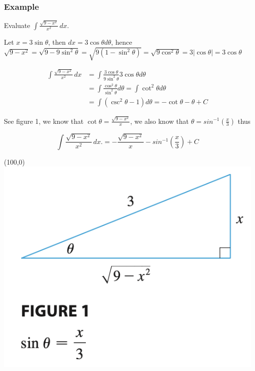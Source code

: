\documentclass[t]{beamer}
\theoremstyle{plain}
\theoremstyle{definition}
\begin{document}
\begin{frame}
\footnotesize
\frametitle{Example}
Evaluate $\displaystyle\int\frac{\sqrt{9-x^{2}}}{x^{2}}\,dx.$ \pause

\medskip

Let $x = 3 \sin \theta$,  then $dx = 3 \cos\theta d\theta$, hence $\sqrt{9 - x^2} = \sqrt{9 - 9 \sin^2\theta} = \sqrt{9 (1 - \sin^2\theta)} = \sqrt{9\cos^2\theta} = 3 |\cos\theta| = 3 \cos\theta$

\begin{align*}
\displaystyle\int\frac{\sqrt{9-x^{2}}}{x^{2}}\,dx &= \displaystyle\int \frac{3 \cos\theta}{9 \sin^2\theta}3\cos\theta d\theta\\
&=\displaystyle\int \frac{\cos^2\theta}{\sin^2\theta}d\theta = \int \cot^2\theta d\theta\\
&=\displaystyle\int(\csc^2\theta -1)d\theta = -\cot\theta - \theta + C
\end{align*}

See figure 1, we know that $\cot\theta =\frac{\sqrt{9 - x^2}}{x}$,  we also know that $\theta = sin^{-1}(\frac{x}{3})$ thus

$$\displaystyle\int\frac{\sqrt{9-x^{2}}}{x^{2}}\,dx. = -\frac{\sqrt{9 - x^2}}{x} - sin^{-1}(\frac{x}{3}) + C$$

\begin{textblock}{0.3}(100,0)
      \includegraphics[scale=0.3]{fig/cot}
\end{textblock}

\end{frame}
\end{document}
